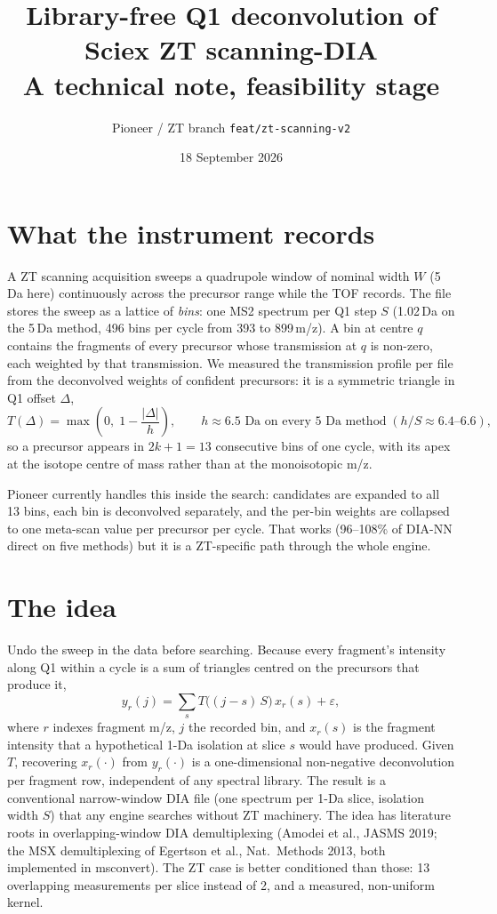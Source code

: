 \documentclass[11pt]{article}
\title{Library-free Q1 deconvolution of Sciex ZT scanning-DIA\\ \large A technical note, feasibility stage}
\author{Pioneer / ZT branch \texttt{feat/zt-scanning-v2}}
\date{18 September 2026}
\begin{document}
\maketitle

\section{What the instrument records}
A ZT scanning acquisition sweeps a quadrupole window of nominal width $W$ (5\,Da here) continuously across the precursor range while the TOF records. The file stores the sweep as a lattice of \emph{bins}: one MS2 spectrum per Q1 step $S$ (1.02\,Da on the 5\,Da method, 496 bins per cycle from 393 to 899\,m/z). A bin at centre $q$ contains the fragments of every precursor whose transmission at $q$ is non-zero, each weighted by that transmission. We measured the transmission profile per file from the deconvolved weights of confident precursors: it is a symmetric triangle in Q1 offset $\Delta$,
\[
T(\Delta)=\max\!\left(0,\;1-\frac{|\Delta|}{h}\right),\qquad h\approx 6.5\text{ Da on every 5 Da method}\;(h/S\approx 6.4\text{--}6.6),
\]
so a precursor appears in $2k+1=13$ consecutive bins of one cycle, with its apex at the isotope centre of mass rather than at the monoisotopic m/z.

Pioneer currently handles this inside the search: candidates are expanded to all 13 bins, each bin is deconvolved separately, and the per-bin weights are collapsed to one meta-scan value per precursor per cycle. That works (96--108\% of DIA-NN direct on five methods) but it is a ZT-specific path through the whole engine.

\section{The idea}
Undo the sweep in the data before searching. Because every fragment's intensity along Q1 within a cycle is a sum of triangles centred on the precursors that produce it,
\[
y_r(j)=\sum_{s} T\!\big((j-s)\,S\big)\,x_r(s)+\varepsilon,
\]
where $r$ indexes fragment m/z, $j$ the recorded bin, and $x_r(s)$ is the fragment intensity that a hypothetical 1-Da isolation at slice $s$ would have produced. Given $T$, recovering $x_r(\cdot)$ from $y_r(\cdot)$ is a one-dimensional non-negative deconvolution per fragment row, independent of any spectral library. The result is a conventional narrow-window DIA file (one spectrum per 1-Da slice, isolation width $S$) that any engine searches without ZT machinery. The idea has literature roots in overlapping-window DIA demultiplexing (Amodei et al., JASMS 2019; the MSX demultiplexing of Egertson et al., Nat.\ Methods 2013, both implemented in msconvert). The ZT case is better conditioned than those: 13 overlapping measurements per slice instead of 2, and a measured, non-uniform kernel.
\end{document}
